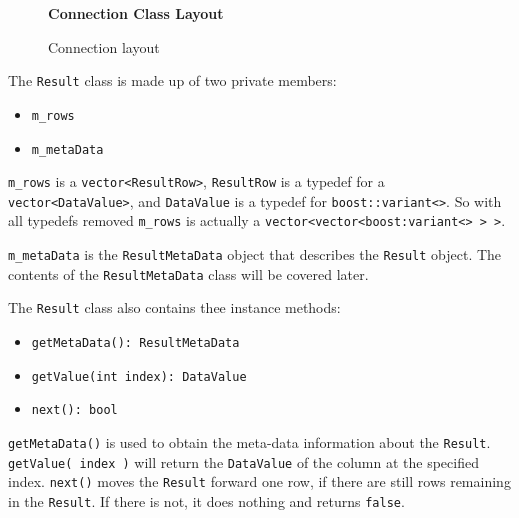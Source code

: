 \documentclass[letterpaper, 12pt]{article}
\begin{document}
  \begin{figure}
    \centering
    \textbf{Connection Class Layout}
	\caption{Connection layout}
  \end{figure}
  \par\vspace{\baselineskip}

  The \lstinline[basicstyle=\ttfamily]|Result| class is made up of two private members:
  \begin{itemize}
    \item \lstinline|m_rows|
    \item \lstinline|m_metaData|
  \end{itemize}
  \lstinline|m_rows| is a
  \lstinline|vector<ResultRow>|,
  \lstinline|ResultRow| is a typedef for
  a \lstinline|vector<DataValue>|, and
  \lstinline|DataValue| is a typedef for
  \lstinline|boost::variant<>|.
  So with all typedefs removed \lstinline|m_rows| is
  actually a
  \lstinline|vector<vector<boost:variant<> > >|.

  \lstinline|m_metaData| is the
  \lstinline|ResultMetaData| object that describes the
  \lstinline|Result| object. The contents of the
  \lstinline|ResultMetaData| class will be covered later.
  \par\vspace{\baselineskip}
  The \lstinline[basicstyle=\ttfamily]|Result| class also contains thee instance methods:
  \begin{itemize}
    \item \lstinline|getMetaData(): ResultMetaData|
    \item \lstinline|getValue(int index): DataValue|
    \item \lstinline|next(): bool|
  \end{itemize}
  \lstinline|getMetaData()| is used to obtain the meta-data
  information about the \lstinline[basicstyle=\ttfamily]|Result|.
  \lstinline|getValue( index )| will return the
  \lstinline|DataValue| of the column at the specified index.
  \lstinline|next()| moves the
  \lstinline|Result| forward one row, if there are still rows
  remaining in the \lstinline[basicstyle=\ttfamily]|Result|. If there is not, it does
  nothing and returns \lstinline[basicstyle=\ttfamily]|false|.
\end{document}
